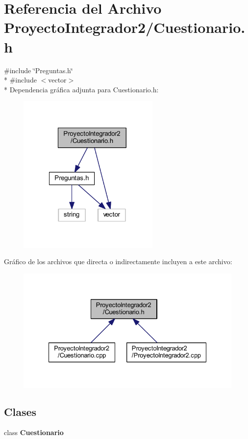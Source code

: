 \section{Referencia del Archivo Proyecto\-Integrador2/\-Cuestionario.h}
\label{_cuestionario_8h}
{\ttfamily \#include \char`\"{}Preguntas.\-h\char`\"{}}\\*
{\ttfamily \#include $<$vector$>$}\\*
Dependencia gráfica adjunta para Cuestionario.\-h\-:
\nopagebreak
\begin{figure}[H]
\begin{center}
\leavevmode
\includegraphics[width=197pt]{_cuestionario_8h__incl}
\end{center}
\end{figure}
Gráfico de los archivos que directa o indirectamente incluyen a este archivo\-:
\nopagebreak
\begin{figure}[H]
\begin{center}
\leavevmode
\includegraphics[width=327pt]{_cuestionario_8h__dep__incl}
\end{center}
\end{figure}
\subsection*{Clases}
\begin{DoxyCompactItemize}
\item 
class {\bf Cuestionario}
\end{DoxyCompactItemize}
